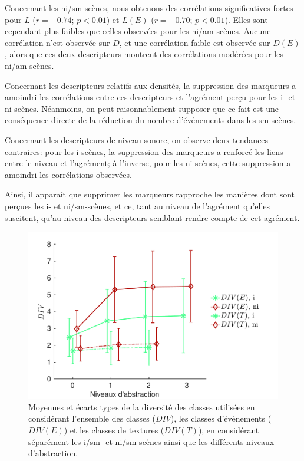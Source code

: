 Concernant les ni/sm-scènes, nous obtenons des corrélations significatives fortes pour $L$ ($r=-0.74$; $p<0.01$) et  $L(E)$ ($r=-0.70$; $p<0.01$). Elles sont cependant plus faibles que celles observées pour les ni/am-scènes. Aucune corrélation n'est observée sur $D$, et une corrélation faible est observée sur $D(E)$, alors que ces deux descripteurs montrent des corrélations modérées pour les ni/am-scènes.
 
Concernant les descripteurs relatifs aux densités, la suppression des marqueurs a amoindri les corrélations entre ces descripteurs et l'agrément perçu pour les i- et ni-scènes. Néanmoins, on peut raisonnablement supposer que ce fait est une conséquence directe de la réduction du nombre d'événements dans les sm-scènes.

Concernant les descripteurs de niveau sonore, on observe deux tendances contraires: pour les i-scènes, la suppression des marqueurs a renforcé les liens entre le niveau et l'agrément; à l'inverse, pour les ni-scènes, cette suppression a amoindri les corrélations observées.

Ainsi, il apparaît que supprimer les marqueurs rapproche les manières dont sont perçues les i- et ni/sm-scènes, et ce, tant au niveau de l'agrément qu'elles suscitent, qu'au niveau des descripteurs semblant rendre compte de cet agrément.

\begin{figure}[t]
        \myfloatalign
        \includegraphics[width=.8\linewidth]{gfx/ch_5/xp4_div_1}
        \caption{Moyennes et écarts types de la diversité des classes utilisées en considérant l'ensemble des classes ($DIV$), les classes d'événements ($DIV(E)$) et les classes de textures ($DIV(T)$), en considérant séparément les i/sm- et ni/sm-scènes ainsi que les différents niveaux d'abstraction.}\label{fig:diversitySansMarker}
\end{figure}

